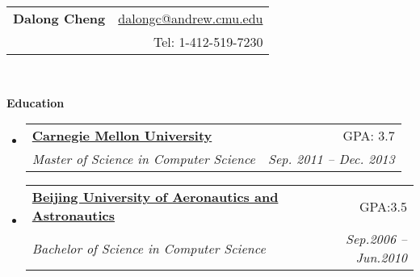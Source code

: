 \documentclass[letterpaper,11pt]{article}
\makeatletter
\newcommand{\resheading}[1]{{\large \colorbox{mygrey}{\begin{minipage}{\textwidth}{\textbf{#1 \vphantom{p\^{E}}}}\end{minipage}}}}
\newcommand{\ressubheading}[4]{
\begin{tabular*}{6.5in}{l@{\extracolsep{\fill}}r}
		\textbf{#1} & #2 \\
		\textit{#3} & \textit{#4} \\
\end{tabular*}\vspace{-6pt}}
\makeatother
\begin{document}
\newcommand{\mywebheader}{
\begin{tabular*}{7in}{l@{\extracolsep{\fill}}r}
	\textbf{\LARGE Dalong Cheng} & \href{mailto:dalongc@andrew.cmu.edu}{dalongc@andrew.cmu.edu}\\
	{\footnotesize \texttt{}} & {Tel: 1-412-519-7230} \\
	\end{tabular*}
\\
\vspace{0.1in}}

\mywebheader

\resheading{Education}
  \begin{itemize}
		\item
      \ressubheading{\href{http://www.cmu.edu}{Carnegie Mellon University}}{GPA: 3.7}{{Master of Science in Computer Science}}{Sep. 2011 -- Dec. 2013}
    \item	
      \ressubheading{\href{http://ev.buaa.edu.cn}{Beijing University of Aeronautics and Astronautics}}{GPA:3.5}{{Bachelor of Science in Computer Science}}{Sep.2006 -- Jun.2010}
	\end{itemize}
\end{document}
